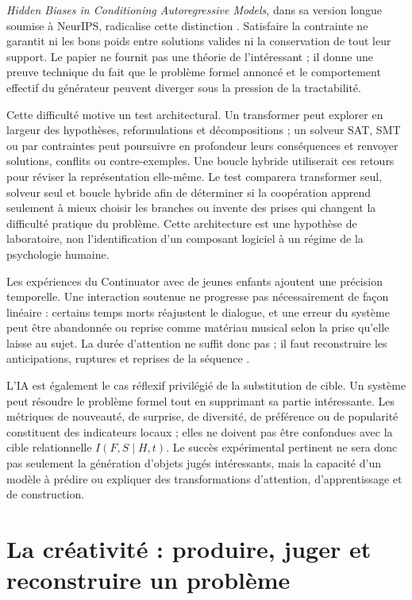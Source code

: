 \documentclass[11pt,a4paper]{article}
\begin{document}
\emph{Hidden Biases in Conditioning Autoregressive Models}, dans sa version
longue soumise à NeurIPS, radicalise cette distinction
\parencite{pachet2026biases}. Satisfaire la contrainte ne garantit ni les bons
poids entre solutions valides ni la conservation de tout leur support. Le papier
ne fournit pas une théorie de l'intéressant ; il donne une preuve technique du
fait que le problème formel annoncé et le comportement effectif du générateur
peuvent diverger sous la pression de la tractabilité.

Cette difficulté motive un test architectural. Un transformer peut explorer en
largeur des hypothèses, reformulations et décompositions ; un solveur SAT, SMT ou
par contraintes peut poursuivre en profondeur leurs conséquences et renvoyer
solutions, conflits ou contre-exemples. Une boucle hybride utiliserait ces
retours pour réviser la représentation elle-même. Le test comparera transformer
seul, solveur seul et boucle hybride afin de déterminer si la coopération apprend
seulement à mieux choisir les branches ou invente des prises qui changent la
difficulté pratique du problème. Cette architecture est une hypothèse de
laboratoire, non l'identification d'un composant logiciel à un régime de la
psychologie humaine.

Les expériences du Continuator avec de jeunes enfants ajoutent une précision
temporelle. Une interaction soutenue ne progresse pas nécessairement de façon
linéaire : certains temps morts réajustent le dialogue, et une erreur du système
peut être abandonnée ou reprise comme matériau musical selon la prise qu'elle
laisse au sujet. La durée d'attention ne suffit donc pas ; il faut reconstruire
les anticipations, ruptures et reprises de la séquence
\parencite{addessi2005experiments,addessi2006flowmachine}.

L'IA est également le cas réflexif privilégié de la substitution de cible. Un
système peut résoudre le problème formel tout en supprimant sa
partie intéressante. Les métriques de nouveauté, de surprise, de diversité, de
préférence ou de popularité constituent des indicateurs locaux ; elles ne
doivent pas être confondues avec la cible relationnelle
\(I(F,S\mid H,t)\). Le succès expérimental pertinent ne sera donc pas seulement
la génération d'objets jugés intéressants, mais la capacité d'un modèle à
prédire ou expliquer des transformations d'attention, d'apprentissage et de
construction.

\section{La créativité : produire, juger et reconstruire un problème}
\end{document}
